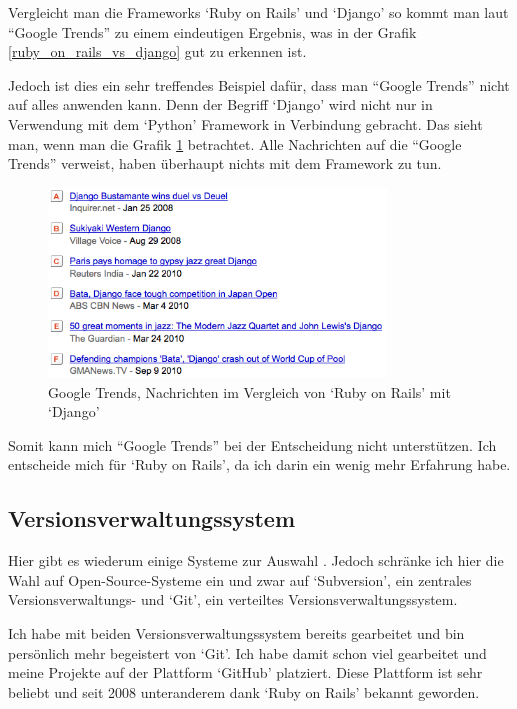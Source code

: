 Vergleicht man die Frameworks `Ruby on Rails' und `Django' so kommt man laut ``Google Trends''
zu einem eindeutigen Ergebnis, was in der Grafik \ref{ruby_on_rails_vs_django} gut
zu erkennen ist.

Jedoch ist dies ein sehr treffendes Beispiel dafür, dass man ``Google Trends'' nicht auf
alles anwenden kann. Denn der Begriff `Django' wird nicht nur in Verwendung
mit dem `Python' Framework in Verbindung gebracht. Das sieht man, wenn man die Grafik
\ref{django_meldungen} betrachtet. Alle Nachrichten auf die ``Google Trends'' verweist,
haben überhaupt nichts mit dem Framework zu tun.

\begin{figure}[ht]
    \begin{center}
        \includegraphics[width=0.8\textwidth,angle=0]{./bilder/django_meldungen.png}
        \caption{Google Trends, Nachrichten im Vergleich von `Ruby on Rails' mit `Django'}
        \label{django_meldungen}
    \end{center}
\end{figure}

Somit kann mich ``Google Trends'' bei der Entscheidung nicht unterstützen. Ich
entscheide mich für `Ruby on Rails', da ich darin ein wenig mehr Erfahrung
habe.

\clearpage

\subsection{Versionsverwaltungssystem}
Hier gibt es wiederum einige Systeme zur Auswahl \cite{versionsverwaltung}.
Jedoch schränke ich hier die Wahl auf Open-Source-Systeme ein und zwar auf
`Subversion', ein zentrales Versionsverwaltungs- und `Git', ein
verteiltes Versionsverwaltungssystem.

Ich habe mit beiden Versionsverwaltungssystem bereits gearbeitet und bin persönlich
mehr begeistert von `Git'. Ich habe damit schon viel gearbeitet und meine Projekte
auf der Plattform `GitHub' platziert. Diese Plattform ist sehr beliebt \cite{github}
und seit 2008 unteranderem dank `Ruby on Rails' bekannt geworden.


